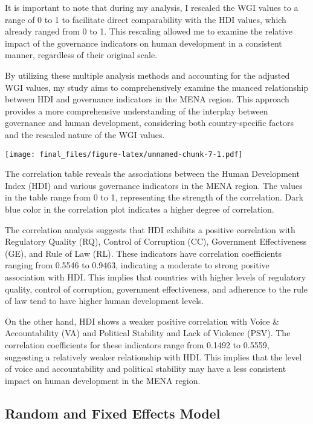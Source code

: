 \documentclass[
  12pt,
]{article}
\begin{document}
It is important to note that during my analysis, I rescaled the WGI values to a range of 0 to 1 to facilitate direct comparability with the HDI values, which already ranged from 0 to 1. This rescaling allowed me to examine the relative impact of the governance indicators on human development in a consistent manner, regardless of their original scale.

By utilizing these multiple analysis methods and accounting for the adjusted WGI values, my study aims to comprehensively examine the nuanced relationship between HDI and governance indicators in the MENA region. This approach provides a more comprehensive understanding of the interplay between governance and human development, considering both country-specific factors and the rescaled nature of the WGI values.

\texttt{[image: final\_files/figure-latex/unnamed-chunk-7-1.pdf]}

The correlation table reveals the associations between the Human Development Index (HDI) and various governance indicators in the MENA region. The values in the table range from 0 to 1, representing the strength of the correlation. Dark blue color in the correlation plot indicates a higher degree of correlation.

The correlation analysis suggests that HDI exhibits a positive correlation with Regulatory Quality (RQ), Control of Corruption (CC), Government Effectiveness (GE), and Rule of Law (RL). These indicators have correlation coefficients ranging from 0.5546 to 0.9463, indicating a moderate to strong positive association with HDI. This implies that countries with higher levels of regulatory quality, control of corruption, government effectiveness, and adherence to the rule of law tend to have higher human development levels.

On the other hand, HDI shows a weaker positive correlation with Voice \& Accountability (VA) and Political Stability and Lack of Violence (PSV). The correlation coefficients for these indicators range from 0.1492 to 0.5559, suggesting a relatively weaker relationship with HDI. This implies that the level of voice and accountability and political stability may have a less consistent impact on human development in the MENA region.

\hypertarget{random-and-fixed-effects-model}{%
\subsection{Random and Fixed Effects Model}\label{random-and-fixed-effects-model}}
\end{document}
